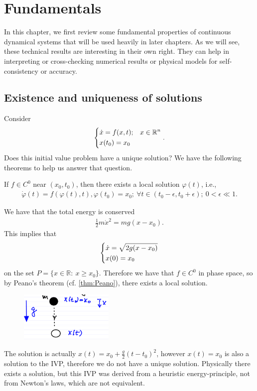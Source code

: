 \chapter{Fundamentals}
 In this chapter, we first review some fundamental properties of continuous dynamical systems that will be used heavily in later chapters. As we will see, these technical results are interesting in their own right. They can help in interpreting or cross-checking numerical results or physical models for self-consistency or accuracy.
\section{Existence and uniqueness of solutions}
Consider  
\begin{align}
\begin{dcases}
	\dot{x} = f(x,t); & x \in \mathbb{R}^{n} \\
	x(t_0) = x_0
\end{dcases}.
\end{align}
Does this initial value problem have a unique solution? We have the following theorems to help us answer that question.
\begin{theorem}[Peano]
	\label{thm:Peano}
	If $f\in C^0$ near $(x_0, t_0)$, then there exists a local solution $\varphi(t)$, i.e., 
\begin{align}
	\dot{\varphi}(t) = f(\varphi(t), t), \varphi(t_0) = x_0;\ \forall  t\in (t_0 - \epsilon, t_0 + \epsilon);\ 0<  \epsilon \ll 1.
\end{align}
\end{theorem}
\begin{ex}
	We have that the total energy is conserved
	\begin{align}
		\frac{1}{2} m \dot{x}^2 = mg(x-x_0).
	\end{align}
This implies that
\begin{align}
	\begin{dcases}
		\dot{x} = \sqrt{2g(x-x_0)} \\
		x(0) = x_0
	\end{dcases}
\end{align}
on the set $P = \{ x \in \mathbb{R}:\ x \geq x_0\}$. Therefore we have that $f\in C^0$ in phase space, so by Peano's theorem (cf. \ref{thm:Peano}), there exists a local solution.
	\begin{figure}[h]
		\centering
		\includegraphics[width=0.4\textwidth]{figures/ch1/1freefall.png}
	\end{figure}
	The solution is actually $x(t) = x_0 + \frac{g}{2}(t-t_0)^2$, however $x(t) = x_0$ is also a solution to the IVP, therefore we do not have a unique solution. Physically there exists a solution, but this IVP was derived from a heuristic energy-principle, not from Newton's laws, which are not equivalent.
\end{ex}

